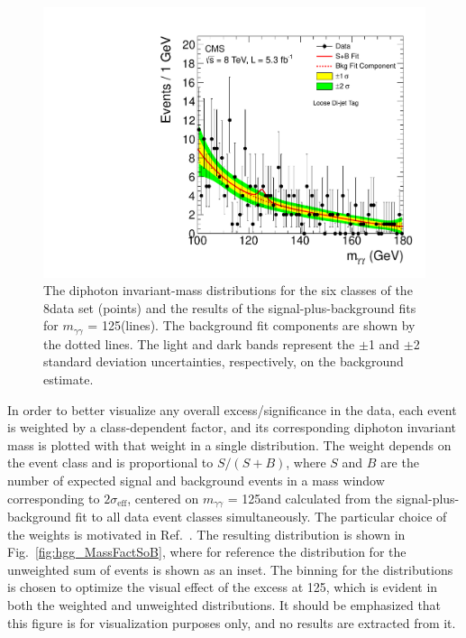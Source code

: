 \documentclass[11pt,twoside,a4paper,cmspaper,final,collab]{cms-tdr}
\begin{document}
\begin{figure}[htbp]
\begin{center}
    \includegraphics[width=0.45\linewidth]{figures/hgg_mvacat5_8TeV}
    \caption{The diphoton invariant-mass distributions for the six classes of the 8\TeV data set (points) and the results of the
    signal-plus-background fits for $m_{\gamma\gamma}$ = 125\GeV (lines). The background fit components are shown by the dotted lines.
     The light and dark bands represent the ${\pm}$1 and ${\pm}$2 standard deviation
       uncertainties, respectively, on the background estimate.
    }
    \label{fig:hgg_BckSig8TeV}
  \end{center}
\end{figure}



In order to better visualize any overall excess/significance in the data,
each event is weighted by a class-dependent factor, and its corresponding diphoton invariant mass is plotted
with that weight in a single distribution. The weight depends on the event class and is proportional to $S/(S+B)$,
where $S$ and $B$ are the number of
expected signal and background events in a mass window corresponding
to $2\sigma_\text{eff}$, centered on $m_{\gamma\gamma}$ = 125\GeV and
calculated from the signal-plus-background fit to all data event classes simultaneously.
The particular choice of the weights is motivated in Ref.~\cite{Barlow:1986ek}.
The resulting distribution is shown in Fig.~\ref{fig:hgg_MassFactSoB}, where
for reference the distribution for the unweighted sum of events is shown as an inset.
The binning for the distributions is chosen to optimize the visual effect
of the excess at 125\GeV, which is evident in both the weighted and unweighted
distributions. It should be emphasized that this figure is for visualization
purposes only, and no results are extracted from it.
\end{document}
